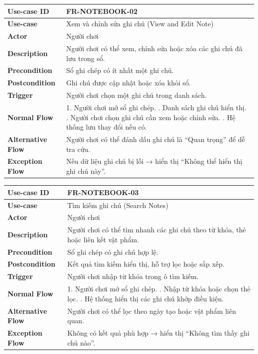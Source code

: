 \begin{table}[H]
\centering
\begin{tabular}{|p{4cm}|p{10cm}|}
\hline
\textbf{Use-case ID} & FR-NOTEBOOK-02 \\ \hline
\textbf{Use-case} & Xem và chỉnh sửa ghi chú (View and Edit Note) \\ \hline
\textbf{Actor} & Người chơi \\ \hline
\textbf{Description} & Người chơi có thể xem, chỉnh sửa hoặc xóa các ghi chú đã lưu trong sổ. \\ \hline
\textbf{Precondition} & Sổ ghi chép có ít nhất một ghi chú. \\ \hline
\textbf{Postcondition} & Ghi chú được cập nhật hoặc xóa khỏi sổ. \\ \hline
\textbf{Trigger} & Người chơi chọn một ghi chú trong danh sách. \\ \hline
\textbf{Normal Flow} &
1. Người chơi mở sổ ghi chép. \newline
2. Danh sách ghi chú hiển thị. \newline
3. Người chơi chọn ghi chú cần xem hoặc chỉnh sửa. \newline
4. Hệ thống lưu thay đổi nếu có. \\ \hline
\textbf{Alternative Flow} &
Người chơi có thể đánh dấu ghi chú là “Quan trọng” để dễ tra cứu. \\ \hline
\textbf{Exception Flow} &
Nếu dữ liệu ghi chú bị lỗi → hiển thị “Không thể hiển thị ghi chú này”. \\ \hline
\end{tabular}
\end{table}


\begin{table}[H]
\centering
\begin{tabular}{|p{4cm}|p{10cm}|}
\hline
\textbf{Use-case ID} & FR-NOTEBOOK-03 \\ \hline
\textbf{Use-case} & Tìm kiếm ghi chú (Search Notes) \\ \hline
\textbf{Actor} & Người chơi \\ \hline
\textbf{Description} & Người chơi có thể tìm nhanh các ghi chú theo từ khóa, thẻ hoặc liên kết vật phẩm. \\ \hline
\textbf{Precondition} & Sổ ghi chép có ghi chú hợp lệ. \\ \hline
\textbf{Postcondition} & Kết quả tìm kiếm hiển thị, hỗ trợ lọc hoặc sắp xếp. \\ \hline
\textbf{Trigger} & Người chơi nhập từ khóa trong ô tìm kiếm. \\ \hline
\textbf{Normal Flow} &
1. Người chơi mở sổ ghi chép. \newline
2. Nhập từ khóa hoặc chọn thẻ lọc. \newline
3. Hệ thống hiển thị các ghi chú khớp điều kiện. \\ \hline
\textbf{Alternative Flow} &
Người chơi có thể lọc theo ngày tạo hoặc vật phẩm liên quan. \\ \hline
\textbf{Exception Flow} &
Không có kết quả phù hợp → hiển thị “Không tìm thấy ghi chú nào”. \\ \hline
\end{tabular}
\end{table}


